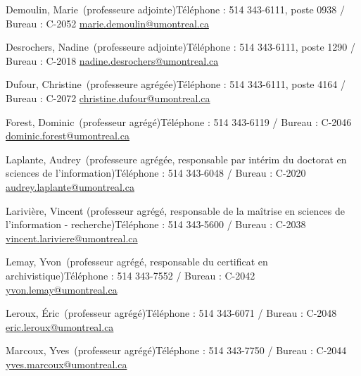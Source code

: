 \documentclass [12 pt]{article}
\begin{document}
            Demoulin, Marie (professeure adjointe)Téléphone : 514
                343-6111, poste 0938 / Bureau : C-2052
        \href{
        mailto:marie.demoulin@umontreal.ca
        } {
        marie.demoulin@umontreal.ca
        }
    
            Desrochers, Nadine (professeure adjointe)Téléphone : 514
                343-6111, poste 1290 / Bureau : C-2018
        \href{
        mailto:nadine.desrochers@umontreal.ca
        } {
        nadine.desrochers@umontreal.ca
        }
    
            Dufour, Christine (professeure agrégée)Téléphone : 514
                343-6111, poste 4164 / Bureau : C-2072
        \href{
        mailto:christine.dufour@umontreal.ca
        } {
        christine.dufour@umontreal.ca
        }
    
            Forest, Dominic (professeur agrégé)Téléphone : 514
                343-6119 / Bureau : C-2046
        \href{
        mailto:dominic.forest@umontreal.ca
        } {
        dominic.forest@umontreal.ca
        }
    
            Laplante, Audrey (professeure agrégée, responsable par intérim
                du doctorat en sciences de l'information)Téléphone : 514 343-6048 / Bureau :
                    C-2020
        \href{
        mailto:audrey.laplante@umontreal.ca
        } {
        audrey.laplante@umontreal.ca
        }
    
            Larivière, Vincent (professeur agrégé, responsable de la
                    maîtrise en sciences de l'information - recherche)Téléphone : 514
                343-5600 / Bureau : C-2038
        \href{
        mailto:vincent.lariviere@umontreal.ca
        } {
        vincent.lariviere@umontreal.ca
        }
    
            Lemay, Yvon (professeur agrégé, responsable du certificat en
                archivistique)Téléphone : 514 343-7552 / Bureau : C-2042
        \href{
        mailto:yvon.lemay@umontreal.ca
        } {
        yvon.lemay@umontreal.ca
        }
    
            Leroux, Éric (professeur agrégé)Téléphone : 514 343-6071 /
                Bureau : C-2048
        \href{
        mailto:eric.leroux@umontreal.ca
        } {
        eric.leroux@umontreal.ca
        }
    
            Marcoux, Yves (professeur agrégé)Téléphone : 514 343-7750
                / Bureau : C-2044
        \href{
        mailto:yves.marcoux@umontreal.ca
        } {
        yves.marcoux@umontreal.ca
        }
    
\end{document}
